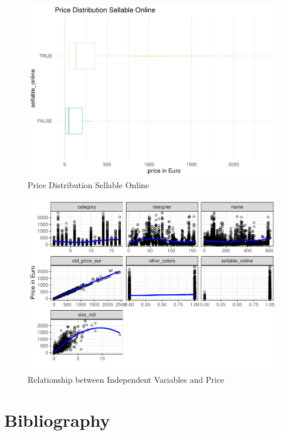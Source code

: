 \documentclass[a4paper, nobind]{templates/ociamthesis}
\begin{document}
\begin{figure}[!h]
\includegraphics[width=1\linewidth]{_main_files/figure-latex/price-dist-sellable-online-1} \caption{Price Distribution Sellable Online}\label{fig:price-dist-sellable-online}
\end{figure}

\begin{figure}[!h]
\includegraphics[width=1\linewidth]{_main_files/figure-latex/relationship-x-y-1} \caption{Relationship between Independent Variables and Price}\label{fig:relationship-x-y}
\end{figure}

\hypertarget{bibliography}{%
\chapter{Bibliography}\label{bibliography}}
\end{document}
